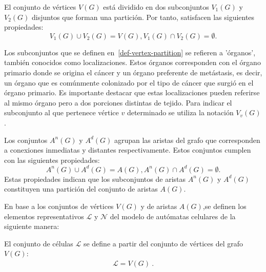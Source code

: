 \begin{definition}
\label{def-vertex-partition}
El conjunto de v\'ertices $V(G)$ est\'a dividido en dos subconjuntos $V_1(G)$ y $V_2(G)$ disjuntos que forman una partici\'on. Por tanto, satisfacen las siguientes propiedades: 
\begin{subequations}
\begin{equation}
V_1(G) \cup V_2(G) = V(G),
\end{equation}
\begin{equation}
V_1(G) \cap V_2(G) = \emptyset.
\end{equation}
\end{subequations}
\end{definition}

Los subconjuntos que se definen en~\ref{def-vertex-partition} se refieren a 'órganos', también conocidos como localizaciones. Estos órganos corresponden con el órgano primario donde se origina el cáncer y un órgano preferente de metástasis, es decir, un órgano que es comúnmente colonizado por el tipo de cáncer que surgió en el órgano primario. Es importante destacar que estas localizaciones pueden referirse al mismo órgano pero a dos porciones distintas de tejido. Para indicar el subconjunto al que pertenece v\'ertice $v$ determinado se utiliza la notaci\'on $V_v(G)$.

\begin{definition}
\label{def-edge-partition}
Los conjuntos $A^n(G)$ y $A^d(G)$ agrupan las aristas del grafo que corresponden a conexiones inmediatas y distantes respectivamente. Estos conjuntos cumplen con las siguientes propiedades:
\begin{subequations}
\begin{equation}
A^n(G) \cup A^d(G) = A(G),
\end{equation}
\begin{equation}
A^n(G) \cap A^d(G) = \emptyset.
\end{equation}
\end{subequations}
Estas propiedades indican que los subconjuntos de aristas $A^n(G)$ y $A^d(G)$ constituyen una partición del conjunto de aristas $A(G)$.
\end{definition}

En base a los conjuntos de vértices $V(G)$ y de aristas $A(G)$,se definen los elementos representativos $\mathcal{L}$ y $\mathcal{N}$ del modelo de autómatas celulares de la siguiente manera:

\begin{definition} 
    \label{def-L}
El conjunto de c\'elulas $\mathcal{L}$ se define a partir del conjunto de v\'ertices del grafo  $V(G)$:
\begin{align}
\boxed{\mathcal{L} = V(G)}~. \label{eq-L}
\end{align}
\end{definition}

